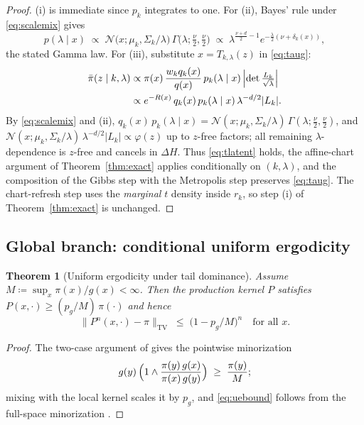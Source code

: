 \documentclass[11pt]{article}
\newtheorem{theorem}{Theorem}
\theoremstyle{remark}
\newcommand{\TV}{\mathrm{TV}}
\begin{document}
\begin{proof}
(i) is immediate since $p_k$ integrates to one. For (ii), Bayes' rule
under \eqref{eq:scalemix} gives
\begin{equation*}
p(\lambda\mid x)\;\propto\;
\mathcal N\!\bigl(x;\mu_k,\Sigma_k/\lambda\bigr)\,
\Gamma\!\bigl(\lambda;\tfrac\nu2,\tfrac\nu2\bigr)
\;\propto\;
\lambda^{\frac{\nu+d}{2}-1}
e^{-\frac{\lambda}{2}(\nu+\delta_k(x))},
\end{equation*}
the stated Gamma law. For (iii), substitute $x=T_{k,\lambda}(z)$ in
\eqref{eq:taug}:
\begin{align*}
\bar\pi(z\mid k,\lambda)
&\propto
\pi(x)\,\frac{w_kq_k(x)}{q(x)}\,p_k(\lambda\mid x)\,
\Bigl|\det\tfrac{L_k}{\sqrt\lambda}\Bigr|\\
&\propto
e^{-R(x)}\,q_k(x)\,p_k(\lambda\mid x)\,
\lambda^{-d/2}\lvert L_k\rvert.
\end{align*}
By \eqref{eq:scalemix} and (ii),
$q_k(x)\,p_k(\lambda\mid x)
=\mathcal N(x;\mu_k,\Sigma_k/\lambda)\,
\Gamma(\lambda;\frac\nu2,\frac\nu2)$, and
$\mathcal N(x;\mu_k,\Sigma_k/\lambda)\,\lambda^{-d/2}\lvert L_k\rvert
\propto\varphi(z)$ up to $z$-free factors; all remaining
$\lambda$-dependence is $z$-free and cancels in $\Delta H$. Thus
\eqref{eq:tlatent} holds, the affine-chart argument of
Theorem~\ref{thm:exact} applies conditionally on $(k,\lambda)$, and the
composition of the Gibbs step with the Metropolis step preserves
\eqref{eq:taug}. The chart-refresh step uses the \emph{marginal} $t$
density inside $r_k$, so step (i) of Theorem~\ref{thm:exact} is
unchanged.
\end{proof}

\subsection{Global branch: conditional uniform ergodicity}
\begin{theorem}[Uniform ergodicity under tail dominance]\label{thm:ue}
\emph{Assume} $M\coloneqq\sup_x\pi(x)/g(x)<\infty$. Then the production
kernel $P$ satisfies $P(x,\cdot)\ge(p_g/M)\,\pi(\cdot)$ and hence
\begin{equation}
\lVert P^n(x,\cdot)-\pi\rVert_{\TV}\;\le\;\bigl(1-p_g/M\bigr)^n
\quad\text{for all }x.
\label{eq:uebound}
\end{equation}
\end{theorem}
\begin{proof}
The two-case argument of \citet{mengersen1996} gives the pointwise
minorization
\begin{equation*}
g(y)\,\Bigl(1\wedge\frac{\pi(y)\,g(x)}{\pi(x)\,g(y)}\Bigr)
\;\ge\;\frac{\pi(y)}{M};
\end{equation*}
mixing with the local kernel scales it by $p_g$, and \eqref{eq:uebound}
follows from the full-space minorization \citep{roberts2004}.
\end{proof}
\end{document}
